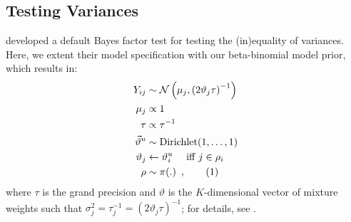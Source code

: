 \documentclass[11pt,a4paper]{article}
\theoremstyle{definition} %
\theoremstyle{case}
\newcommand{\numberthis}{\addtocounter{equation}{1}\tag{\theequation}}
\begin{document}
\subsection{Testing Variances}
\textcite{dablander2020default} developed a default Bayes factor test for testing the (in)equality of variances. Here, we extent their model specification with our beta-binomial model prior, which results in:
\begin{align*}
    Y_{ij}                   &\sim \mathcal{N}\left(\mu_j, \left(2\vartheta_j\tau\right)^{-1}\right)\\
    \mu_j                    &\propto 1  \\
    \tau                     &\propto \tau^{-1} \\
    \vec{\vartheta}^u     &\sim \text{Dirichlet}(1, \ldots, 1) \\
    \vartheta_j              &\leftarrow \vartheta^u_i \quad\text{ iff } j \in \rho_i \\
    \rho                     &\sim \pi(.) \enspace , \numberthis
\end{align*}
where $\tau$ is the grand precision and $\vartheta$ is the $K$-dimensional vector of mixture weights such that $\sigma_j^2 = \tau_j^{-1} = \left(2\vartheta_j\tau\right)^{-1}$; for details, see \textcite{dablander2020default}.

\end{document}
